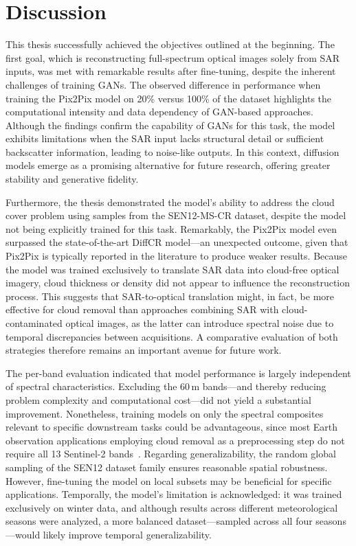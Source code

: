 \chapter{Discussion}
\label{chapter:discussion}
This thesis successfully achieved the objectives outlined at the beginning. The first goal, which is reconstructing full-spectrum optical images solely from SAR inputs, was met with remarkable results after fine-tuning, despite the inherent challenges of training GANs. The observed difference in performance when training the Pix2Pix model on 20\% versus 100\% of the dataset highlights the computational intensity and data dependency of GAN-based approaches.
Although the findings confirm the capability of GANs for this task, the model exhibits limitations when the SAR input lacks structural detail or sufficient backscatter information, leading to noise-like outputs. In this context, diffusion models emerge as a promising alternative for future research, offering greater stability and generative fidelity.

Furthermore, the thesis demonstrated the model’s ability to address the cloud cover problem using samples from the SEN12-MS-CR dataset, despite the model not being explicitly trained for this task. Remarkably, the Pix2Pix model even surpassed the state-of-the-art DiffCR model—an unexpected outcome, given that Pix2Pix is typically reported in the literature to produce weaker results.
Because the model was trained exclusively to translate SAR data into cloud-free optical imagery, cloud thickness or density did not appear to influence the reconstruction process. This suggests that SAR-to-optical translation might, in fact, be more effective for cloud removal than approaches combining SAR with cloud-contaminated optical images, as the latter can introduce spectral noise due to temporal discrepancies between acquisitions. A comparative evaluation of both strategies therefore remains an important avenue for future work.

The per-band evaluation indicated that model performance is largely independent of spectral characteristics. Excluding the 60\,m bands—and thereby reducing problem complexity and computational cost—did not yield a substantial improvement. Nonetheless, training models on only the spectral composites relevant to specific downstream tasks could be advantageous, since most Earth observation applications employing cloud removal as a preprocessing step do not require all 13 Sentinel-2 bands~\cite{CR_SEN2_dRNN}.
Regarding generalizability, the random global sampling of the SEN12 dataset family ensures reasonable spatial robustness. However, fine-tuning the model on local subsets may be beneficial for specific applications. Temporally, the model’s limitation is acknowledged: it was trained exclusively on winter data, and although results across different meteorological seasons were analyzed, a more balanced dataset—sampled across all four seasons—would likely improve temporal generalizability.

